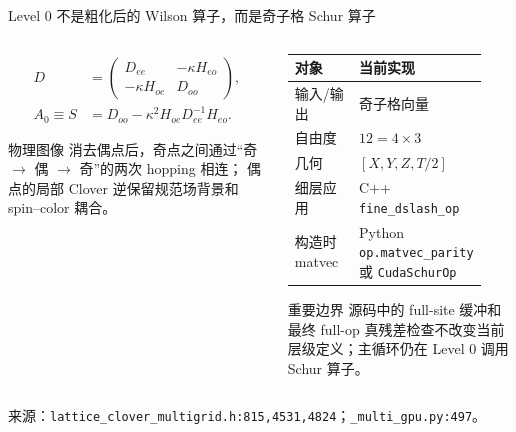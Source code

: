 \documentclass[UTF8,aspectratio=169,11pt]{ctexbeamer}
\newcommand{\source}[1]{%
  \vspace{-0.08em}\par{\raggedright\scriptsize\color{muted}来源：#1\par}}
\newcommand{\src}[1]{\nolinkurl{#1}}
\begin{document}
\begin{frame}[t]{Level 0 不是粗化后的 Wilson 算子，而是奇子格 Schur 算子}
  \begin{columns}[T,totalwidth=\textwidth]
    \begin{column}{0.49\textwidth}
      \setlength{\jot}{2pt}
      \begin{align*}
        D&=\begin{pmatrix}
          D_{ee}&-\kappa H_{eo}\\
          -\kappa H_{oe}&D_{oo}
        \end{pmatrix},\\
        A_0\equiv S&=D_{oo}-\kappa^2H_{oe}D_{ee}^{-1}H_{eo}.
      \end{align*}
      \begin{block}{物理图像}
        \small
        消去偶点后，奇点之间通过“奇 $\to$ 偶 $\to$ 奇”的两次 hopping 相连；
        偶点的局部 Clover 逆保留规范场背景和 spin--color 耦合。
      \end{block}
    \end{column}
    \begin{column}{0.45\textwidth}
      \renewcommand{\arraystretch}{0.82}
      \begin{tabular}{@{}P{0.34\linewidth}P{0.52\linewidth}@{}}
        \toprule
        对象 & 当前实现 \\
        \midrule
        输入/输出 & 奇子格向量 \\
        自由度 & $12=4\times3$ \\
        几何 & $[X,Y,Z,T/2]$ \\
        细层应用 & C++ \src{fine_dslash_op} \\
        构造时 matvec & Python \src{op.matvec_parity} 或 \src{CudaSchurOp} \\
        \bottomrule
      \end{tabular}
      \vspace{0.12em}
      \begin{block}{重要边界}
        \footnotesize
        源码中的 full-site 缓冲和最终 full-op 真残差检查不改变当前层级定义；主循环仍在
        Level 0 调用 Schur 算子。
      \end{block}
    \end{column}
  \end{columns}
  \source{\src{lattice_clover_multigrid.h:815,4531,4824}；\src{_multi_gpu.py:497}。}
\end{frame}
\end{document}
